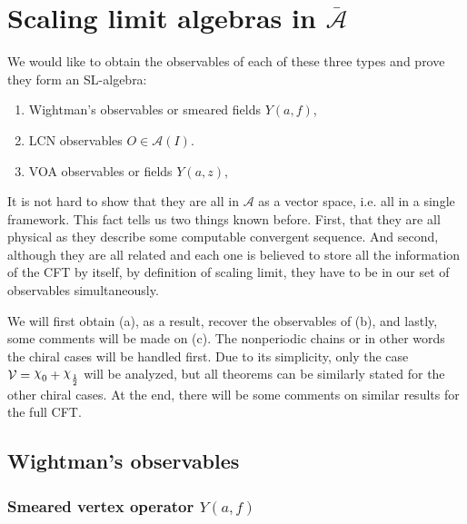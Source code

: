 \documentclass[twoside,11pt,titlepage]{amsart}
\renewcommand{\=}[1]{\stackrel{#1}{=}} %
\theoremstyle{definition}
\theoremstyle{remark}
\DeclareRobustCommand{\rchi}{{\mathpalette\irchi\relax}}
\newcommand{\irchi}[2]{\raisebox{\depth}{$#1\chi$}}
\begin{document}
\section{Scaling limit algebras in \texorpdfstring{$\overline{\mathcal{A}}$}{TEXT}}\label{4}

We would like to obtain the observables of each of these three types and prove they form an SL-algebra:
\begin{enumerate}
    \item Wightman's observables or smeared fields $Y(a,f)$,
    \item LCN observables $O \in \mathcal{A}(I)$.
    \item VOA observables or fields $Y(a,z)$,
\end{enumerate}
It is not hard to show that they are all in $\mathcal{A}$ as a vector space, i.e. all in a single framework. This fact tells us two things known before. First, that they are all physical as they describe some computable convergent sequence. And second, although they are all related and each one is believed to store all the information of the CFT by itself, by definition of scaling limit, they have to be in our set of observables simultaneously.

We will first obtain (a), as a result, recover the observables of (b), and lastly, some comments will be made on (c). The nonperiodic chains or in other words the chiral cases will be handled first. Due to its simplicity, only the case $\mathcal{V}=\rchi_0+\rchi_\frac{1}{2}$ will be analyzed, but all theorems can be similarly stated for the other chiral cases. At the end, there will be some comments on similar results for the full CFT.

\subsection{Wightman's observables}\label{4.1}

\subsubsection{Smeared vertex operator $Y(a,f)$}
\end{document}
